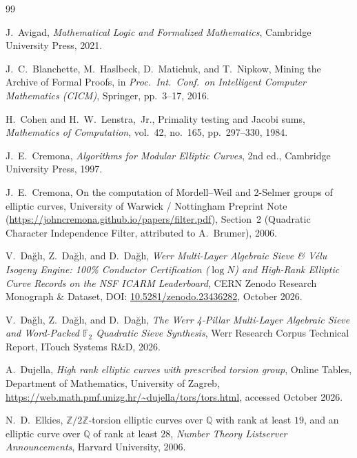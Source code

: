 \documentclass[10pt,a4paper]{article}
\theoremstyle{plain}
\theoremstyle{definition}
\theoremstyle{remark}
\begin{document}
\begin{thebibliography}{99}

J.~Avigad,
\emph{Mathematical Logic and Formalized Mathematics},
Cambridge University Press, 2021.

J.~C.~Blanchette, M.~Haslbeck, D.~Matichuk, and T.~Nipkow,
Mining the Archive of Formal Proofs,
in \emph{Proc.\ Int.\ Conf.\ on Intelligent Computer Mathematics (CICM)}, Springer, pp.~3--17, 2016.

H.~Cohen and H.~W.~Lenstra,~Jr.,
Primality testing and Jacobi sums,
\emph{Mathematics of Computation}, vol.~42, no.~165, pp.~297--330, 1984.

J.~E.~Cremona,
\emph{Algorithms for Modular Elliptic Curves},
2nd ed., Cambridge University Press, 1997.

J.~E.~Cremona,
On the computation of Mordell--Weil and 2-Selmer groups of elliptic curves,
University of Warwick / Nottingham Preprint Note (\url{https://johncremona.github.io/papers/filter.pdf}), Section~2 (Quadratic Character Independence Filter, attributed to A.~Brumer), 2006.

V.~Da\u{g}l\i, Z.~Da\u{g}l\i, and D.~Da\u{g}l\i,
\emph{Werr Multi-Layer Algebraic Sieve \& V\'{e}lu Isogeny Engine: 100\% Conductor Certification ($\log N$) and High-Rank Elliptic Curve Records on the NSF ICARM Leaderboard},
CERN Zenodo Research Monograph \& Dataset, DOI: \href{https://doi.org/10.5281/zenodo.23436282}{10.5281/zenodo.23436282}, October 2026.

V.~Da\u{g}l\i, Z.~Da\u{g}l\i, and D.~Da\u{g}l\i,
\emph{The Werr 4-Pillar Multi-Layer Algebraic Sieve and Word-Packed $\mathbb{F}_2$ Quadratic Sieve Synthesis},
Werr Research Corpus Technical Report, ITouch Systems R\&D, 2026.

A.~Dujella,
\emph{High rank elliptic curves with prescribed torsion group},
Online Tables, Department of Mathematics, University of Zagreb, \url{https://web.math.pmf.unizg.hr/~dujella/tors/tors.html}, accessed October 2026.

N.~D.~Elkies,
$\mathbb{Z}/2\mathbb{Z}$-torsion elliptic curves over $\mathbb{Q}$ with rank at least $19$, and an elliptic curve over $\mathbb{Q}$ of rank at least $28$,
\emph{Number Theory Listserver Announcements}, Harvard University, 2006.


\end{thebibliography}
\end{document}
